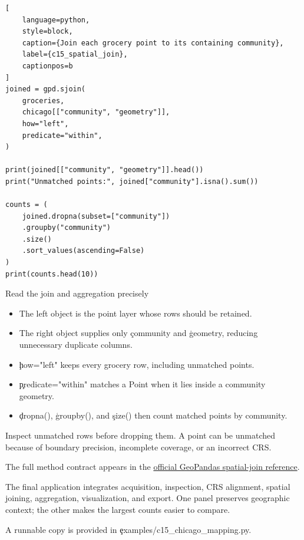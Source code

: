 \begin{lstlisting}[
    language=python,
    style=block,
    caption={Join each grocery point to its containing community},
    label={c15_spatial_join},
    captionpos=b
]
joined = gpd.sjoin(
    groceries,
    chicago[["community", "geometry"]],
    how="left",
    predicate="within",
)

print(joined[["community", "geometry"]].head())
print("Unmatched points:", joined["community"].isna().sum())

counts = (
    joined.dropna(subset=["community"])
    .groupby("community")
    .size()
    .sort_values(ascending=False)
)
print(counts.head(10))
\end{lstlisting}

\begin{SyntaxBox}{Read the join and aggregation precisely}
\begin{itemize}
    \item The left object is the point layer whose rows should be retained.
    \item The right object supplies only \c{community} and \c{geometry}, reducing
          unnecessary duplicate columns.
    \item \c{how="left"} keeps every grocery row, including unmatched points.
    \item \c{predicate="within"} matches a Point when it lies inside a community
          geometry.
    \item \c{dropna()}, \c{groupby()}, and \c{size()} then count matched points by
          community.
\end{itemize}
Inspect unmatched rows before dropping them. A point can be unmatched because
of boundary precision, incomplete coverage, or an incorrect CRS.
\end{SyntaxBox}

The full method contract appears in the
\href{https://geopandas.org/en/stable/docs/reference/api/geopandas.sjoin.html}{official GeoPandas spatial-join reference}.

\label{sec:c15-application}

The final application integrates acquisition, inspection, CRS alignment,
spatial joining, aggregation, visualization, and export. One panel preserves
geographic context; the other makes the largest counts easier to compare.

A runnable copy is provided in \c{examples/c15_chicago_mapping.py}.

